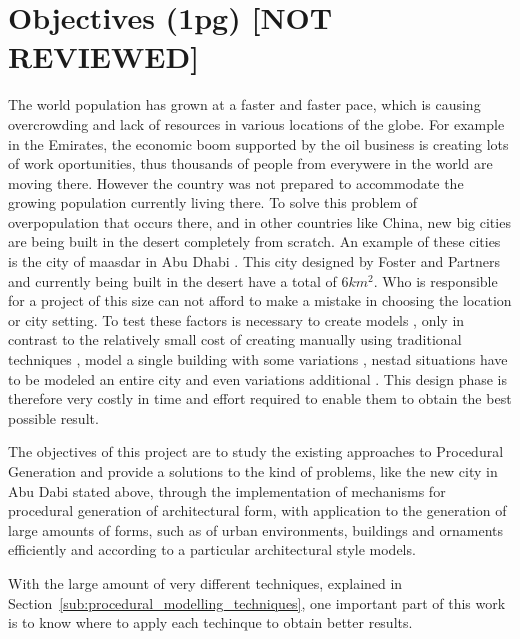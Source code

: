 
% 
% 

\section{Objectives (1pg) [NOT REVIEWED]}
\label{sec:objectives}%



The world population has grown at a faster and faster pace, which is causing overcrowding and lack of resources in various locations of the globe. For example in the Emirates, the economic boom supported by the oil business is creating lots of work oportunities, thus thousands of people from everywere in the world are moving there. However the country was not prepared to accommodate the growing population currently living there. 
To solve this problem of overpopulation that occurs there, and in other countries like China, new big cities are being built in the desert completely from scratch. An example of these cities is the city of maasdar in Abu Dhabi . This city designed by Foster and Partners and currently being built in the desert have a total of $6km^2$. Who is responsible for a project of this size can not afford to make a mistake in choosing the location or city setting.
To test these factors is necessary to create models , only in contrast to the relatively small cost of creating manually using traditional techniques , model a single building with some variations , nestad situations have to be modeled an entire city and even variations additional . This  design phase is therefore very costly in time and effort required to enable them to obtain the best possible result.

The objectives of this project are to study the existing approaches to Procedural Generation and provide a solutions to the kind of problems, like the new city in Abu Dabi stated above, through the implementation of mechanisms for procedural generation of architectural form, with application to the generation of large amounts of forms, such as of urban environments, buildings and ornaments efficiently and according to a particular architectural style models.

With the large amount of very different techniques, explained in Section~\ref{sub:procedural_modelling_techniques}, one important part of this work is to know where to apply each techinque to obtain better results.




